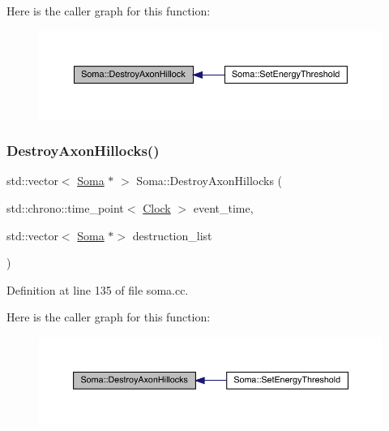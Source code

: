 Here is the caller graph for this function\+:
\nopagebreak
\begin{figure}[H]
\begin{center}
\leavevmode
\includegraphics[width=350pt]{class_soma_af6d6d3e3c94f06682cf05a7a72032a46_icgraph}
\end{center}
\end{figure}
\mbox{\label{class_soma_a5220929442601962af1a1fad66a8c919}} 
\subsubsection{\texorpdfstring{Destroy\+Axon\+Hillocks()}{DestroyAxonHillocks()}}
{\footnotesize\ttfamily std\+::vector$<$ \hyperlink{class_soma}{Soma} $\ast$ $>$ Soma\+::\+Destroy\+Axon\+Hillocks (\begin{DoxyParamCaption}\item[{std\+::chrono\+::time\+\_\+point$<$ \hyperlink{universe_8h_a0ef8d951d1ca5ab3cfaf7ab4c7a6fd80}{Clock} $>$}]{event\+\_\+time,  }\item[{std\+::vector$<$ \hyperlink{class_soma}{Soma} $\ast$$>$}]{destruction\+\_\+list }\end{DoxyParamCaption})}



Definition at line 135 of file soma.\+cc.

Here is the caller graph for this function\+:
\nopagebreak
\begin{figure}[H]
\begin{center}
\leavevmode
\includegraphics[width=350pt]{class_soma_a5220929442601962af1a1fad66a8c919_icgraph}
\end{center}
\end{figure}
\mbox{\label{class_soma_a086cb5a05e82f6f58ac0bd8403e25e07}} 
